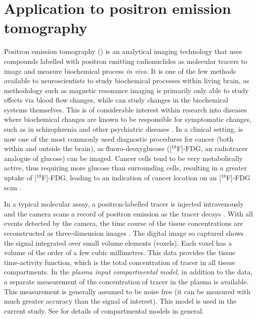 \section{Application to positron emission tomography}
\label{sec:Application to positron emission tomography}

Positron emission tomography (\pet) is an analytical imaging technology that
uses compounds labelled with positron emitting radionuclides as molecular
tracers to image and measure biochemical process \emph{in vivo}. It is one of
the few methods available to neuroscientists to study biochemical processes
within living brain, as methodology such as magnetic resonance imaging is
primarily only able to study effects via blood flow changes, while \pet can
study changes in the biochemical systems themselves. This is of considerable
interest within research into diseases where biochemical changes are known to
be responsible for symptomatic changes, such as in schizophrenia and other
psychiatric diseases \cite{FrankleL2002}.  In a clinical setting, \pet is now
one of the most commonly used diagnostic procedures for cancer (both within
and outside the brain), as fluoro-deoxyglucose ([$^{18}$F]-FDG, an radiotracer
analogue of glucose) can be imaged. Cancer cells tend to be very metabolically
active, thus requiring more glucose than surrounding cells, resulting in a
greater uptake of [$^{18}$F]-FDG, leading to an indication of cancer location
on an [$^{18}$F]-FDG scan \cite{Gambhir2002}.

In a typical molecular assay, a positron-labelled tracer is injected
intravenously and the \pet camera scans a record of positron emission as
the tracer decays \cite{Phelps2000}.  With all events detected by the \pet
camera, the time course of the tissue concentrations are reconstructed as
three-dimension images \cite{Kinahan1989}. The digital image so captured
shows the signal integrated over small volume elements (voxels). Each voxel
has a volume of the order of a few cubic millimetres. This data provides
the tissue time-activity function, which is the total concentration of
tracer in all tissue compartments. In the \emph{plasma input compartmental
  model}, in addition to the \pet data, a separate measurement of the
concentration of tracer in the plasma is available. This measurement is
generally assumed to be noise free (it can be measured with much greater
accuracy than the signal of interest). This model is used in the current
study. See \cite{Gunn:2001cx} for details of \pet compartmental models in
general.

